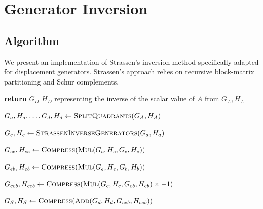 \section{Generator Inversion}
\label{section:inversion}

\subsection{Algorithm}
We present an implementation of Strassen's inversion method
specifically adapted for displacement generators.
Strassen's approach relies on recursive block-matrix partitioning and
Schur complements,

\begin{algorithm}[H]
  \caption{Strassen-type Inversion for Displacement Generators}
  \begin{algorithmic}[1]

    \caption{Strassen-type Inversion for Displacement Generators
    (adapted from \cite{aecf-2017-pdf})}

     

    \State \textbf{return} $G_D$ $H_D$ representing the inverse of
    the scalar value of $A$ from $G_A, H_A$

    \EndIf

    \Statex

    \State $G_a, H_a, \dots, G_d, H_d \gets
    \textsc{SplitQuadrants}(G_A, H_A)$ 

    \Statex {}

    \State $G_e, H_e \gets \textsc{StrassenInverseGenerators}(G_a,
    H_a)$ 

    \Statex

    \State $G_{ce}, H_{ce} \gets \textsc{Compress}(\textsc{Mul}(G_c,
    H_c, G_e, H_e))$ 

    \State $G_{eb}, H_{eb} \gets \textsc{Compress}(\textsc{Mul}(G_e,
    H_e, G_b, H_b))$

    \State $G_{ceb}, H_{ceb} \gets
    \textsc{Compress}(\textsc{Mul}(G_c, H_c, G_{eb}, H_{eb}) \times -1)$

    \State $G_S, H_S \gets \textsc{Compress}(\textsc{Add}(G_d, H_d,
    G_{ceb}, H_{ceb}))$ 

    \Statex {}


\end{algorithmic}
\end{algorithm}
